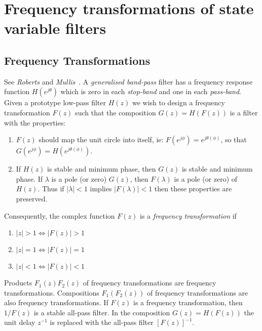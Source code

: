 \documentclass[a4paper,twoside,10pt,english]{report}
\begin{document}
\chapter{Frequency transformations of state variable filters}
\section{Frequency Transformations}
See \emph{Roberts} and
\emph{Mullis}~\cite[Section 6.7]{RobertsMullis_DigitalSignalProcessing}.
A \emph{generalised band-pass} filter has a frequency response function
$H\left(e^{j\theta}\right)$ which is zero in each \emph{stop-band}
and one in each \emph{pass-band}. Given a prototype low-pass filter
$H\left(z\right)$ we wish to design a frequency transformation $F\left(z\right)$
such that the composition $G\left(z\right)=H\left(F\left(z\right)\right)$
is a filter with the properties:
\begin{enumerate}
\item $F\left(z\right)$ should map the unit circle into itself, ie: $F\left(e^{j\phi}\right)=e^{j\theta\left(\phi\right)}$,
so that $G\left(e^{j\phi}\right)=H\left(e^{j\theta\left(\phi\right)}\right)$.
\item If $H\left(z\right)$ is stable and minimum phase, then $G\left(z\right)$
is stable and minimum phase. If $\lambda$ is a pole (or zero) $G\left(z\right)$,
then $F\left(\lambda\right)$ is a pole (or zero) of $H\left(z\right)$.
Thus if $\left|\lambda\right|<1$ implies $\left|F\left(\lambda\right)\right|<1$
then these properties are preserved.
\end{enumerate}
Consequently, the complex function $F\left(z\right)$ is a \emph{frequency
transformation} if
\begin{enumerate}
\item $\left|z\right|>1\Leftrightarrow\left|F\left(z\right)\right|>1$
\item $\left|z\right|=1\Leftrightarrow\left|F\left(z\right)\right|=1$
\item $\left|z\right|<1\Leftrightarrow\left|F\left(z\right)\right|<1$
\end{enumerate}
Products $F_{1}\left(z\right)F_{2}\left(z\right)$ of frequency transformations
are frequency transformations. Compositions $F_{1}\left(F_{2}\left(z\right)\right)$
of frequency transformations are also frequency transformations. If
$F\left(z\right)$ is a frequency transformation, then $1/F\left(z\right)$
is a stable all-pass filter. In the composition $G\left(z\right)=H\left(F\left(z\right)\right)$
the unit delay $z^{-1}$ is replaced with the all-pass filter $\left[F\left(z\right)\right]^{-1}$.
\end{document}
